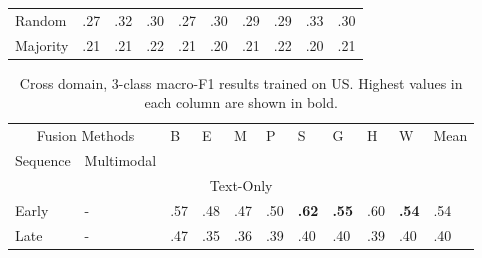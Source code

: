 \documentclass{article}
\begin{document}
\begin{table}[h]
\begin{tabular}{|lllllllllll|}
\multicolumn{2}{|l|}{Random}                                                      & .27                & .32                & .30                & .27                & .30                & .29                & .29                & \multicolumn{1}{l|}{.33}                & .30                   \\
\multicolumn{2}{|l|}{Majority}                                                    & .21                & .21                & .22                & .21                & .20                & .21                & .22                & \multicolumn{1}{l|}{.20}                & .21                   \\ \hline
\end{tabular}
\end{table}


\begin{table}[h]
\centering
\caption{Cross domain, 3-class macro-F1 results trained on US. Highest values in each column are shown in bold.}
\begin{tabular}{|lllllllllll|}
\hline
\multicolumn{2}{|c|}{Fusion Methods}                                              & \multirow{2}{*}{B} & \multirow{2}{*}{E} & \multirow{2}{*}{M} & \multirow{2}{*}{P} & \multirow{2}{*}{S} & \multirow{2}{*}{G} & \multirow{2}{*}{H} & \multicolumn{1}{l|}{\multirow{2}{*}{W}} & \multirow{2}{*}{Mean} \\ \cline{1-2}
\multicolumn{1}{|l|}{Sequence}               & \multicolumn{1}{l|}{Multimodal}    &                    &                    &                    &                    &                    &                    &                    & \multicolumn{1}{l|}{}                   &                       \\ \hline
\multicolumn{11}{|c|}{Text-Only}                                                                                                                                                                                                                                                                       \\ \hline
\multicolumn{1}{|l|}{Early}                  & \multicolumn{1}{l|}{-}             & .57                & .48                & .47                & .50                & \textbf{.62}       & \textbf{.55}       & .60                & \multicolumn{1}{l|}{\textbf{.54}}       & .54                   \\
\multicolumn{1}{|l|}{Late}                   & \multicolumn{1}{l|}{-}             & .47                & .35                & .36                & .39                & .40                & .40                & .39                & \multicolumn{1}{l|}{.40}                & .40                   \\ \hline

\end{tabular}
\end{table}
\end{document}
